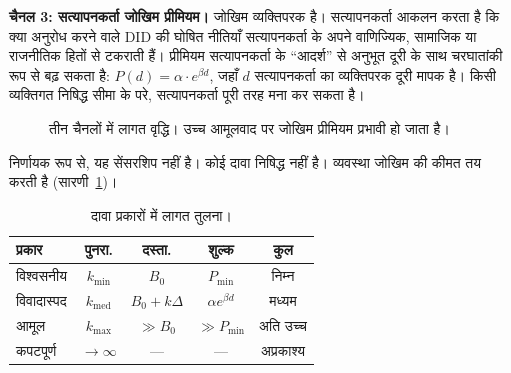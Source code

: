 \documentclass[11pt,a4paper,twocolumn]{article}
\begin{document}
\textbf{चैनल 3: सत्यापनकर्ता जोखिम प्रीमियम।} जोखिम व्यक्तिपरक है। सत्यापनकर्ता आकलन करता है कि क्या अनुरोध करने वाले DID की घोषित नीतियाँ सत्यापनकर्ता के अपने वाणिज्यिक, सामाजिक या राजनीतिक हितों से टकराती हैं। प्रीमियम सत्यापनकर्ता के ``आदर्श'' से अनुभूत दूरी के साथ चरघातांकी रूप से बढ़ सकता है: $P(d) = \alpha \cdot e^{\beta d}$, जहाँ $d$ सत्यापनकर्ता का व्यक्तिपरक दूरी मापक है। किसी व्यक्तिगत निषिद्ध सीमा के परे, सत्यापनकर्ता पूरी तरह मना कर सकता है।

\begin{figure}[ht]
\centering
{}
\caption{तीन चैनलों में लागत वृद्धि। उच्च आमूलवाद पर जोखिम प्रीमियम प्रभावी हो जाता है।}
\label{fig:radicalism}
\end{figure}

निर्णायक रूप से, यह सेंसरशिप नहीं है। कोई दावा निषिद्ध नहीं है। व्यवस्था जोखिम की कीमत तय करती है (सारणी~\ref{tab:costs})।

\begin{table}[ht]
\centering
\caption{दावा प्रकारों में लागत तुलना।}
\label{tab:costs}
\footnotesize
\begin{tabular}{@{}lcccc@{}}
\toprule
\textbf{प्रकार} & \textbf{पुनरा.} & \textbf{दस्ता.} & \textbf{शुल्क} & \textbf{कुल} \\
\midrule
विश्वसनीय & $k_{\min}$ & $B_0$ & $P_{\min}$ & निम्न \\
विवादास्पद & $k_{\text{med}}$ & $B_0{+}k\Delta$ & $\alpha e^{\beta d}$ & मध्यम \\
आमूल & $k_{\max}$ & $\gg B_0$ & $\gg P_{\min}$ & अति उच्च \\
कपटपूर्ण & $\to\infty$ & --- & --- & अप्रकाश्य \\
\bottomrule
\end{tabular}
\end{table}
\end{document}
